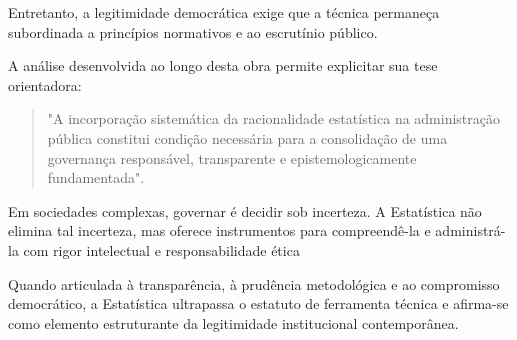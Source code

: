 Entretanto, a legitimidade democrática exige que a técnica permaneça subordinada a princípios normativos e ao escrutínio público. \vskip0.3cm


A análise desenvolvida ao longo desta obra permite explicitar sua tese orientadora:

\begin{quote}
"A incorporação sistemática da racionalidade estatística na administração pública constitui condição necessária para a consolidação de uma governança responsável, transparente e epistemologicamente fundamentada".
\end{quote}

Em sociedades complexas, governar é decidir sob incerteza. A Estatística não elimina tal incerteza, mas oferece instrumentos para compreendê-la e administrá-la com rigor intelectual e responsabilidade ética \vskip0.3cm

Quando articulada à transparência, à prudência metodológica e ao compromisso democrático, a Estatística ultrapassa o estatuto de ferramenta técnica e afirma-se como elemento estruturante da legitimidade institucional contemporânea.











